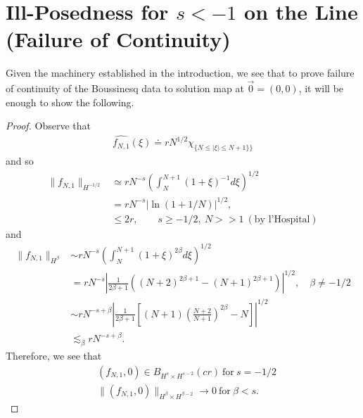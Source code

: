 \documentclass[12pt,reqno]{amsart}
\numberwithin{equation}{section}  %
\newcommand{\wh}{\widehat}
\begin{document}
\section{Ill-Posedness for $s < -1$ on the Line (Failure of Continuity)} 
Given the machinery established in the introduction, we see that to prove failure of continuity of the Boussinesq data to solution map at $\vec{0} =
(0, 0)$, it will be enough to show the
following.
%
%
%
%
%
%
%
%
%
%
%
%
%
\begin{proof}
%
Observe that
%
%
\begin{equation}
\begin{split}
  \wh{f_{N,1}}(\xi) \doteq r N^{1/2} \chi_{\{N \le |\xi| \le N + 1\}\}}
\end{split}
\end{equation}
%
and so
%
%
%
\begin{equation*}
\begin{split}
  \| f_{N,1} \|_{H^{-1/2}}
  & \simeq rN^{-s} \left( \int_{N}^{N+1} (1 + \xi)^{-1} d \xi
  \right)^{1/2}
  \\
  & = rN^{-s} \left| \ln (1 + 1/N) \right|^{1/2},
  \\
  & \le 2r, \qquad s \ge -1/2, \ N >>1 \ (\text{by l'Hospital})
\end{split}
\end{equation*}
%
%
and 
%
\begin{equation*}
\begin{split}
  \| f_{N,1} \|_{H^{\beta}}
  & \sim rN^{-s} \left( \int_{N}^{N+1} (1 + \xi)^{2\beta} d \xi
  \right)^{1/2}
  \\
  & = rN^{-s} \left| \frac{1}{2\beta+1}( (N+2)^{2\beta+1} - (N+1)^{2\beta+1} ) \right|^{1/2}, \quad \beta \neq -1/2
  \\
  & \sim r N^{-s + \beta} \left| {\frac{1}{2\beta+1}}\left [ (N+1) \left( \frac{N+2}{N+1}
  \right)^{2\beta} -N \right ] \right|^{1/2}  \\
  & \lesssim_{\beta} r N^{-s + \beta}.
\end{split}
\end{equation*}
%
Therefore, we see that 
\begin{equation*}
  \begin{split}
     & (f_{N,1}, 0) \in B_{H^{s} \times H^{s-2}}(cr) \ \text{for} \ s = -1/2  
\\
    & \|(f_{N,1}, 0)\|_{H^{\beta} \times H^{\beta -2}} \to 0 \ \text{for} \ \beta < s.

\end{split}
\end{equation*}
\end{proof}
\end{document}
